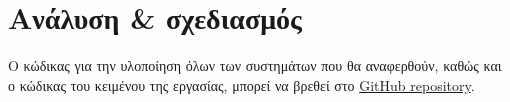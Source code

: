 \hideheader
\section{Ανάλυση \& σχεδιασμός}

Ο κώδικας για την υλοποίηση όλων των συστημάτων που θα αναφερθούν, καθώς και ο κώδικας του κειμένου της εργασίας, μπορεί να βρεθεί στο \href{https://github.com/DevTotoro/AlgoQuest}{GitHub repository}\cite{batsikas_devtotoroalgoquest_2024}.






